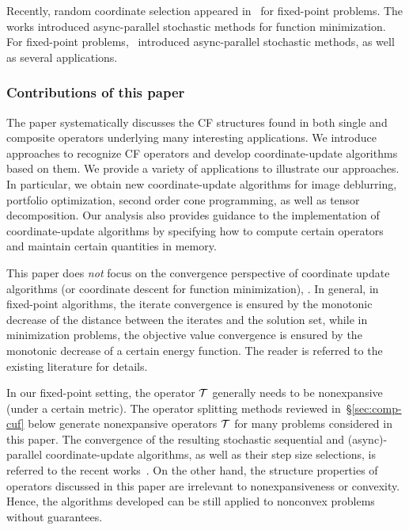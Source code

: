 Recently, random coordinate selection appeared in~\cite{Patrick_2015} for fixed-point problems. The works \cite{nedic2001distributed,recht2011hogwild,liu2013asynchronous,liu2014asynchronous,hsieh2015passcode} introduced async-parallel stochastic methods for function minimization.
For fixed-point problems,~\cite{Peng_2015_AROCK} introduced  async-parallel stochastic methods, as well as several applications.  

\subsubsection{Contributions of this paper} 
The paper systematically discusses the CF structures found in both single and composite operators underlying many interesting applications. We introduce approaches to recognize CF operators and develop coordinate-update algorithms based on them. 
We provide a variety of applications to illustrate our approaches. 
In particular, we obtain new coordinate-update algorithms for image deblurring, portfolio optimization, second order cone programming, as well as tensor decomposition. Our analysis also provides guidance to the implementation of coordinate-update algorithms by specifying how to compute certain operators and maintain certain quantities in memory. 
 
This paper does \emph{not} focus on the convergence perspective of coordinate update algorithms (or coordinate descent for function minimization), . In general, in fixed-point algorithms, the iterate convergence is ensured by the monotonic decrease of the distance between the iterates and the solution set, while in minimization problems, the objective value convergence is ensured by the monotonic decrease of a certain energy function. The reader is referred to the existing literature for details. 


In our fixed-point setting, the operator ${\mathcal{T}}$ generally needs to be  nonexpansive (under a certain metric). The operator splitting methods reviewed in~\S\ref{sec:comp-cuf} below generate nonexpansive operators ${\mathcal{T}}$ for many problems considered in this paper. The convergence of the resulting stochastic sequential and  (async)-parallel coordinate-update algorithms, as well as their step size selections, is referred to the recent works~\cite{Patrick_2015,Peng_2015_AROCK}. On the other hand, the structure properties of operators discussed in this paper are irrelevant to nonexpansiveness or convexity. Hence, the algorithms developed can be still applied to nonconvex problems without guarantees.


